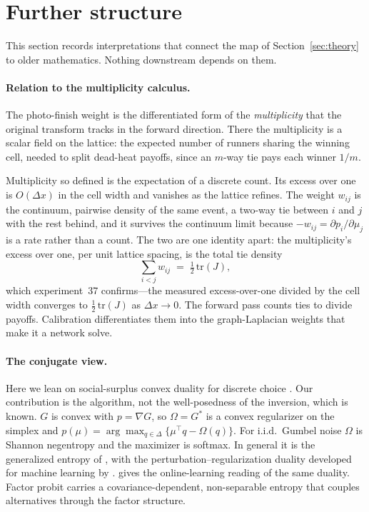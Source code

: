 \documentclass[12pt]{article}
\theoremstyle{remark}
\begin{document}
\section{Further structure}\label{sec:structure}

This section records interpretations that connect the map of
Section~\ref{sec:theory} to older mathematics. Nothing downstream
depends on them.

\paragraph{Relation to the multiplicity calculus.} The photo-finish weight
is the differentiated form of the \emph{multiplicity} that the original
transform \citep{cotton2021} tracks in the forward direction. There the
multiplicity is a scalar field on the lattice: the expected number of
runners sharing the winning cell, needed to split dead-heat payoffs,
since an $m$-way tie pays each winner $1/m$.

Multiplicity so defined is the expectation of a discrete count. Its
excess over one is $O(\Delta x)$ in the cell width and vanishes as
the lattice refines. The weight $w_{ij}$ is the continuum, pairwise
density of the same event, a two-way tie between $i$ and $j$ with the
rest behind, and it survives the continuum limit because
$-w_{ij} = \partial p_i/\partial\mu_j$ is a rate rather than a count. The
two are one identity apart: the multiplicity's excess over one, per unit
lattice spacing, is the total tie density
\[
\sum_{i<j} w_{ij} \;=\; \tfrac12\,\mathrm{tr}(J),
\]
which experiment~37 confirms---the measured excess-over-one divided by
the cell width converges to $\tfrac12\,\mathrm{tr}(J)$ as
$\Delta x \to 0$. The forward pass counts ties to divide payoffs.
Calibration differentiates them into the graph-Laplacian weights that
make it a network solve.

\paragraph{The conjugate view.} Here we lean on social-surplus convex
duality for discrete choice \citep{chiong2016,norets2013}. Our
contribution is the algorithm, not the well-posedness of the inversion,
which is known. $G$ is
convex with $p = \nabla G$, so $\Omega = G^*$ is a convex regularizer on
the simplex and $p(\mu) = \arg\max_{q \in \Delta}\{\mu^\top q -
\Omega(q)\}$. For i.i.d.\ Gumbel noise $\Omega$ is Shannon negentropy and
the maximizer is softmax. In general it is the generalized entropy of
\citet{fosgerau2020}, with the perturbation--regularization duality
developed for machine learning by \citet{berthet2020}.
\citet{melo2025} gives the online-learning reading of the same
duality. Factor probit
carries a covariance-dependent, non-separable entropy that couples
alternatives through the factor structure. 
\end{document}
